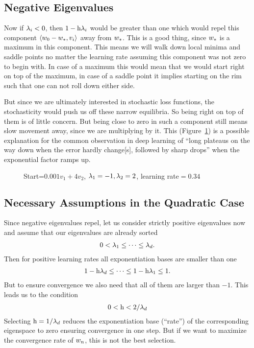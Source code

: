 \subsection{Negative Eigenvalues}\label{subsec: Negative Eigenvalues}

Now if \(\lambda_i<0\), then \(1-\text{h}\lambda_i\) would be greater
than one which would repel this component \(\langle w_0 - w_*,
v_i\rangle\) away from \(w_*\). This is a good thing, since \(w_*\)
is a maximum in this component. This means we will walk down local minima and
saddle points no matter the learning rate assuming  this component  was not
zero to begin with. In case of a maximum this would mean that we would start
right on top of the maximum, in case of a saddle point it implies starting on
the rim such that one can not roll down either side.

But since we are ultimately interested in stochastic loss functions, the
stochasticity would push us off these narrow equilibria. So being right on
top of them is of little concern. But being close to zero in such a component
still means slow movement away, since we are multiplying by it. This
(Figure~\ref{fig: visualize saddle point gd}) is a possible explanation for the
common observation in deep learning of ``long
plateaus on the way down when the error hardly change[s], followed
by sharp drops'' \parencite{sejnowskiUnreasonableEffectivenessDeep2020} when
the exponential factor ramps up.
%
\begin{figure}[h]
	\centering
	\def\svgwidth{1\textwidth}
	
	\caption{Start=\(0.001v_1+4v_2\), \(\lambda_1=-1, \lambda_2=2\), learning rate\(=0.34\)}
	\label{fig: visualize saddle point gd}
\end{figure}

\subsection{Necessary Assumptions in the Quadratic Case}
\label{subsec: necessary assumptions in the quadratic case}

Since negative eigenvalues repel, let us consider strictly positive eigenvalues
now and assume that our eigenvalues are already sorted
%
\begin{align}
	0 < \lambda_1 \le \dots \le \lambda_d.
\end{align}
%
Then for positive learning rates all exponentiation bases are smaller than one
%
\begin{align*}
	1-\text{h}\lambda_d \le \dots \le 1-\text{h}\lambda_1 \le 1.
\end{align*}
%
But to ensure convergence we also need that all of them are larger than \(-1\).
This leads us to the condition
\begin{align}\label{eq: learning rate restriction (eigenvalue)}
	0< \text{h} < 2/\lambda_d
\end{align}
%
Selecting \(\text{h} = 1/\lambda_d\) reduces the exponentiation base (``rate'') of the
corresponding eigenspace to zero ensuring convergence in one step.
But if we want to maximize the convergence rate of \(w_n\), this is not
the best selection.

